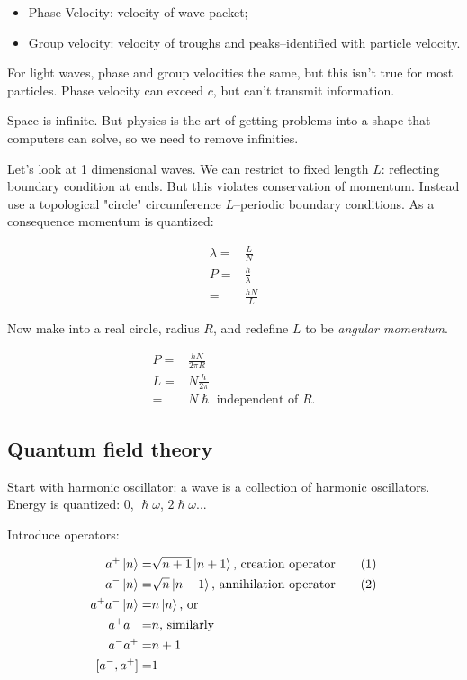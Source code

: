 \documentclass[]{article}
\newcommand\numberthis{\addtocounter{equation}{1}\tag{\theequation}}
\begin{document}
\begin{itemize}
	\item Phase Velocity: velocity of wave packet;
	\item Group velocity: velocity of troughs and peaks--identified with particle velocity.
\end{itemize}

For light waves, phase and group velocities the same, but this isn't true for most particles. Phase velocity can exceed $c$, but can't transmit information.

Space is infinite. But physics is the art of getting problems into a shape that computers can solve, so we need to remove infinities.

Let's look at 1 dimensional waves. We can restrict to fixed length $L$: reflecting boundary condition at ends. But this violates conservation of momentum. Instead use a topological "circle" circumference $L$--periodic boundary conditions. As a consequence momentum is quantized: 

\begin{align*}
\lambda =& \frac{L}{N}\\
P =& \frac{h}{\lambda}\\
=& \frac{h N}{L}
\end{align*}

Now make into a real circle, radius $R$, and redefine $L$ to be \emph{angular momentum}.

\begin{align*}
P =& \frac{h N}{2 \pi R}\\
L =& N \frac{h}{2 \pi}\\
=& N \hslash \text{ independent of $R$.}
\end{align*}

\subsection{Quantum field theory}

Start with harmonic oscillator: a wave is a collection of harmonic oscillators. Energy is quantized: 0, $\hslash \omega$, $2\hslash \omega$...

Introduce operators:

\begin{align*}
a^+ \ket{n} =& \sqrt{n+1} \ket{n+1} \text{, creation operator} \numberthis \label{eq:creation}\\
a^- \ket{n} =& \sqrt{n} \ket{n-1} \text{, annihilation operator} \numberthis \label{eq:annihilation} \\
a^+ a^- \ket{n} =& n \ket{n} \text{, or}\\
a^+ a^-  =& n \text{, similarly}\\
a^- a^+  =& n+1\\
[a^-, a^+] =& 1
\end{align*}
\end{document}
